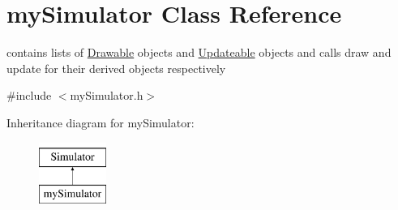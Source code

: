 \hypertarget{classmy_simulator}{}\section{my\+Simulator Class Reference}
\label{classmy_simulator}


contains lists of \mbox{\hyperlink{class_drawable}{Drawable}} objects and \mbox{\hyperlink{class_updateable}{Updateable}} objects and calls draw and update for their derived objects respectively  




{\ttfamily \#include $<$my\+Simulator.\+h$>$}

Inheritance diagram for my\+Simulator\+:\begin{figure}[H]
\begin{center}
\leavevmode
\includegraphics[height=2.000000cm]{classmy_simulator}
\end{center}
\end{figure}
